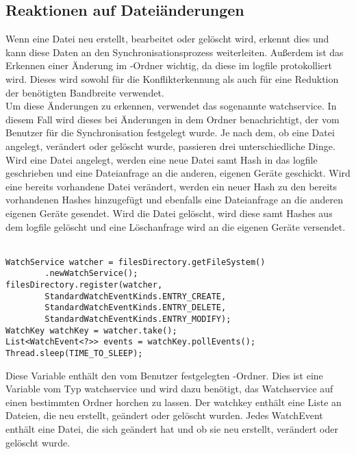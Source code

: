 \subsection{Reaktionen auf Dateiänderungen}
Wenn eine Datei neu erstellt, bearbeitet oder gelöscht wird, erkennt dies \sblit und kann diese Daten an den Synchronisationsprozess weiterleiten. Außerdem ist das Erkennen einer Änderung im \sblit-Ordner wichtig, da diese im \gls{logfile} protokolliert wird. Dieses wird sowohl für die Konflikterkennung  als auch für eine Reduktion der benötigten Bandbreite  verwendet.\\
Um diese Änderungen zu erkennen, verwendet \sblit das sogenannte \gls{watchservice}. In diesem Fall wird dieses bei Änderungen in dem Ordner benachrichtigt, der vom Benutzer für die Synchronisation festgelegt wurde. Je nach dem, ob eine Datei angelegt, verändert oder gelöscht wurde, passieren drei unterschiedliche Dinge. Wird eine Datei angelegt, werden eine neue Datei samt Hash in das \gls{logfile} geschrieben und eine Dateianfrage an die anderen, eigenen Geräte geschickt. Wird eine bereits vorhandene Datei verändert, werden ein neuer Hash zu den bereits vorhandenen Hashes hinzugefügt und ebenfalls eine Dateianfrage an die anderen eigenen Geräte gesendet. Wird die Datei gelöscht, wird diese samt Hashes aus dem \gls{logfile} gelöscht und eine Löschanfrage wird an die eigenen Geräte versendet.\\ \\
\javalisting
\begin{minipage}{\linewidth}
\begin{lstlisting}[caption={Initialisierung des \gls{watchservice}},captionpos=b]
WatchService watcher = filesDirectory.getFileSystem()
		.newWatchService();
filesDirectory.register(watcher,
		StandardWatchEventKinds.ENTRY_CREATE,
		StandardWatchEventKinds.ENTRY_DELETE,
		StandardWatchEventKinds.ENTRY_MODIFY);
WatchKey watchKey = watcher.take();
List<WatchEvent<?>> events = watchKey.pollEvents();
Thread.sleep(TIME_TO_SLEEP);
\end{lstlisting}
\end{minipage}
\begin{description}
	Diese Variable enthält den vom Benutzer festgelegten \sblit-Ordner.
	Dies ist eine Variable vom Typ \gls{watchservice} und wird dazu benötigt, das Watchservice auf einen bestimmten Ordner horchen zu lassen.
	Der \gls{watchkey} enthält eine Liste an Dateien, die neu erstellt, geändert oder gelöscht wurden.
	Jedes WatchEvent enthält eine Datei, die sich geändert hat und ob sie neu erstellt, verändert oder gelöscht wurde. 
\end{description}
